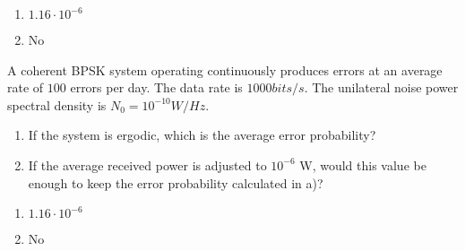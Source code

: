 \documentclass[idioma,boletin]{uah}
\begin{document}
{

\begin{enumerate}
	\item $1.16 \cdot 10^{-6}$
	\item No
\end{enumerate}
}
{


A coherent BPSK system operating continuously produces errors at an average rate of $100$ errors per day. The data rate is $1000 bits/s$. The unilateral noise power spectral density is $N_0 = 10^{-10} W/Hz$. 


\begin{enumerate}
	\item If the system is ergodic, which is the average error probability?
	\item If the average received power is adjusted to $10^{-6}$ W, would this value be enough to keep the error probability calculated in a)?
\end{enumerate} 

}
{

\begin{enumerate}
	\item $1.16 \cdot 10^{-6}$
	\item No
\end{enumerate}
}

\newpage
\end{document}
